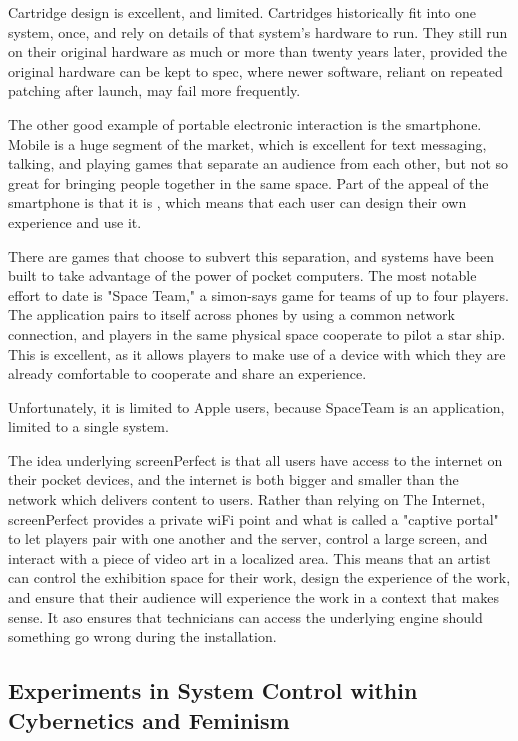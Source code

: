 Cartridge design is excellent, and limited. Cartridges historically fit into one system, once, and rely on details of that system's hardware to run. They still run on their original hardware as much or more than twenty years later, provided the original hardware can be kept to spec, where newer software, reliant on repeated patching after launch, may fail more frequently.

The other good example of portable electronic interaction is the smartphone. Mobile is a huge segment of the market, which is excellent for text messaging, talking, and playing games that separate an audience from each other, but not so great for bringing people together in the same space. Part of the appeal of the smartphone is that it is , which means that each user can design their own experience and use it. 

There are games that choose to subvert this separation, and systems have been built to take advantage of the power of pocket computers. The most notable effort to date is "Space Team," a simon-says game for teams of up to four players. The application pairs to itself across phones by using a common network connection, and players in the same physical space cooperate to pilot a star ship. This is excellent, as it allows players to make use of a device with which they are already comfortable to cooperate and share an experience.

Unfortunately, it is limited to Apple users, because SpaceTeam is an application, limited to a single system.

The idea underlying screenPerfect is that all users have access to the internet on their pocket devices, and the internet is both bigger and smaller than the network which delivers content to users. Rather than relying on The Internet, screenPerfect provides a private wiFi point and what is called a "captive portal" to let players pair with one another and the server, control a large screen, and interact with a piece of video art in a localized area. This means that an artist can control the exhibition space for their work, design the experience of the work, and ensure that their audience will experience the work in a context that makes sense. It aso ensures that technicians can access the underlying engine should something go wrong during the installation.


\subsection{Experiments in System Control within Cybernetics and Feminism}

